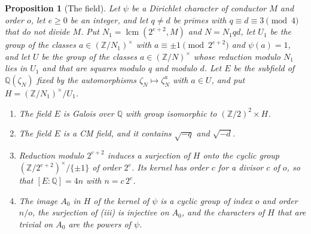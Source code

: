 \documentclass[11pt,letterpaper]{article}
\newtheorem{proposition}[theorem]{Proposition}
\numberwithin{equation}{section}
\begin{document}
\begin{proposition}[The field]\label{field}
Let $\psi$ be a Dirichlet character of conductor $M$ and order $o$, let $e\ge0$ be an integer, and let $q\ne d$ be primes with $q\equiv d\equiv3\pmod4$ that do not divide $M$. Put $N_1=\operatorname{lcm}(2^{e+2},M)$ and $N=N_1qd$, let $U_1$ be the group of the classes $a\in(\mathbb Z/N_1)^\times$ with $a\equiv\pm1\pmod{2^{e+2}}$ and $\psi(a)=1$, and let $U$ be the group of the classes $a\in(\mathbb Z/N)^\times$ whose reduction modulo $N_1$ lies in $U_1$ and that are squares modulo $q$ and modulo $d$. Let $E$ be the subfield of $\mathbb Q(\zeta_N)$ fixed by the automorphisms $\zeta_N\mapsto\zeta_N^a$ with $a\in U$, and put $H=(\mathbb Z/N_1)^\times/U_1$.
\begin{enumerate}
\item[(i)] The field $E$ is Galois over $\mathbb Q$ with group isomorphic to $(\mathbb Z/2)^2\times H$.
\item[(ii)] The field $E$ is a CM field, and it contains $\sqrt{-q}$ and $\sqrt{-d}$.
\item[(iii)] Reduction modulo $2^{e+2}$ induces a surjection of $H$ onto the cyclic group $(\mathbb Z/2^{e+2})^\times/\{\pm1\}$ of order $2^e$. Its kernel has order $c$ for a divisor $c$ of $o$, so that $[E:\mathbb Q]=4n$ with $n=c\,2^e$.
\item[(iv)] The image $A_0$ in $H$ of the kernel of $\psi$ is a cyclic group of index $o$ and order $n/o$, the surjection of (iii) is injective on $A_0$, and the characters of $H$ that are trivial on $A_0$ are the powers of $\psi$.
\end{enumerate}
\end{proposition}
\end{document}
